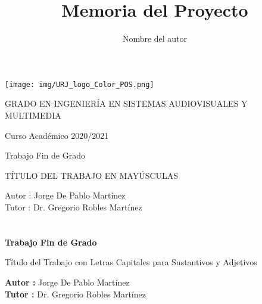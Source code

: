 \documentclass[a4paper, 12pt]{book}
\title{Memoria del Proyecto}
\author{Nombre del autor}
\begin{document}
\renewcommand{\refname}{Bibliografía}  %
\renewcommand{\appendixname}{Apéndice}


\begin{titlepage}
\begin{center}
\texttt{[image: img/URJ\_logo\_Color\_POS.png]}

\vspace{1.75cm}

\Large
GRADO EN INGENIERÍA EN SISTEMAS AUDIOVISUALES Y MULTIMEDIA

\vspace{0.4cm}

\large
Curso Académico 2020/2021

\vspace{0.8cm}

Trabajo Fin de Grado

\vspace{2.5cm}

\LARGE
TÍTULO DEL TRABAJO EN MAYÚSCULAS

\vspace{4cm}

\large
Autor : Jorge De Pablo Martínez \\
Tutor : Dr. Gregorio Robles Martínez
\end{center}
\end{titlepage}

\newpage
\mbox{}
\thispagestyle{empty} %


\clearpage
{}
\chapter*{}

\vspace{-4cm}
\begin{center}
\LARGE
\textbf{Trabajo Fin de Grado}

\vspace{1cm}
\large
Título del Trabajo con Letras Capitales para Sustantivos y Adjetivos

\vspace{1cm}
\large
\textbf{Autor :} Jorge De Pablo Martínez \\
\textbf{Tutor :} Dr. Gregorio Robles Martínez

\end{center}
\end{document}
